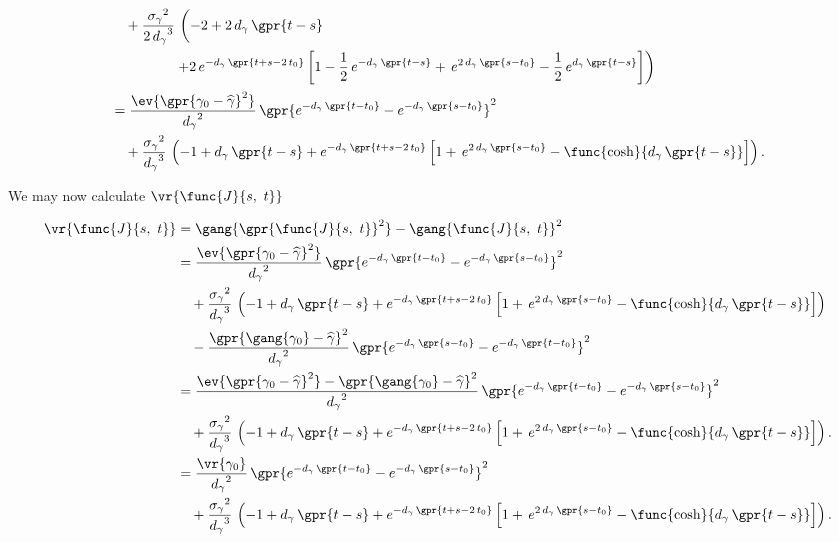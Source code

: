 \begin{align}
    	&\quad + \frac{{\sigma_{\gamma}}^2}{2\,{d_{\gamma}}^3}\,\left(-2 + 2\,d_{\gamma}\,\gpr{t-s} \phantom{\frac{1}{2}} \right.\nonumber \\
    		&\phantom{\frac{{\sigma_{\gamma}}^2}{2\,{d_{\gamma}}^3}\,}\qquad  \left. + 2\,e^{-d_{\gamma}\,\gpr{t + s - 2\,t_0}} \left[ 1  - \frac{1}{2}\,e^{-d_{\gamma}\,\gpr{t-s}}  + \,e^{2\,d_{\gamma}\,\gpr{s-t_0}} - \frac{1}{2}\,e^{d_{\gamma}\,\gpr{t - s}} \right] \right) \nonumber \\
    	&= \frac{\ev{\gpr{\gamma_{0} - \widehat{\gamma}}^2}}{{d_{\gamma}}^2}\,\gpr{e^{-d_{\gamma}\,\gpr{t - t_{0}}} - e^{-d_{\gamma}\,\gpr{s - t_{0}}}}^2 \nonumber \\
    	&	\quad + \frac{{\sigma_{\gamma}}^2}{{d_{\gamma}}^3}\,\left(-1 + d_{\gamma}\,\gpr{t-s} + e^{-d_{\gamma}\,\gpr{t + s - 2\,t_0}} \left[ 1 + \,e^{2\,d_{\gamma}\,\gpr{s-t_0}} - \func{\cosh}{d_{\gamma}\,\gpr{t - s}} \right] \right).
\end{align}

We may now calculate $\vr{\func{J}{s,\ t}}$

\begin{align}
    \vr{\func{J}{s,\ t}} &= \gang{\gpr{\func{J}{s,\ t}}^2} - \gang{\func{J}{s,\ t}}^2 \nonumber \\
		&= \frac{\ev{\gpr{\gamma_{0} - \widehat{\gamma}}^2}}{{d_{\gamma}}^2}\,\gpr{e^{-d_{\gamma}\,\gpr{t - t_{0}}} - e^{-d_{\gamma}\,\gpr{s - t_{0}}}}^2 \nonumber \\
    		&\quad + \frac{{\sigma_{\gamma}}^2}{{d_{\gamma}}^3}\,\left(-1 + d_{\gamma}\,\gpr{t-s} + e^{-d_{\gamma}\,\gpr{t + s - 2\,t_0}} \left[ 1 + \,e^{2\,d_{\gamma}\,\gpr{s-t_0}} - \func{\cosh}{d_{\gamma}\,\gpr{t - s}} \right] \right) \nonumber \\
    		&\quad - \frac{\gpr{\gang{\gamma_0} - \widehat{\gamma}}^{2}}{{d_{\gamma}}^2}\,\gpr{e^{-d_{\gamma}\,\gpr{s - t_0}} - e^{-d_{\gamma}\,\gpr{t - t_0}}}^2 \nonumber \\
    	&= \frac{\ev{\gpr{\gamma_{0} - \widehat{\gamma}}^2} - \gpr{\gang{\gamma_0} - \widehat{\gamma}}^{2}}{{d_{\gamma}}^2}\,\gpr{e^{-d_{\gamma}\,\gpr{t - t_{0}}} - e^{-d_{\gamma}\,\gpr{s - t_{0}}}}^2 \nonumber \\
    		&\quad + \frac{{\sigma_{\gamma}}^2}{{d_{\gamma}}^3}\,\left(-1 + d_{\gamma}\,\gpr{t-s} + e^{-d_{\gamma}\,\gpr{t + s - 2\,t_0}} \left[ 1 + \,e^{2\,d_{\gamma}\,\gpr{s-t_0}} - \func{\cosh}{d_{\gamma}\,\gpr{t - s}} \right] \right). \nonumber \\
    	&= \frac{\vr{\gamma_0}}{{d_{\gamma}}^2}\,\gpr{e^{-d_{\gamma}\,\gpr{t - t_{0}}} - e^{-d_{\gamma}\,\gpr{s - t_{0}}}}^2 \nonumber \\
    		&\quad + \frac{{\sigma_{\gamma}}^2}{{d_{\gamma}}^3}\,\left(-1 + d_{\gamma}\,\gpr{t-s} + e^{-d_{\gamma}\,\gpr{t + s - 2\,t_0}} \left[ 1 + \,e^{2\,d_{\gamma}\,\gpr{s-t_0}} - \func{\cosh}{d_{\gamma}\,\gpr{t - s}} \right] \right). \label{eqn:var_Jst}
\end{align}